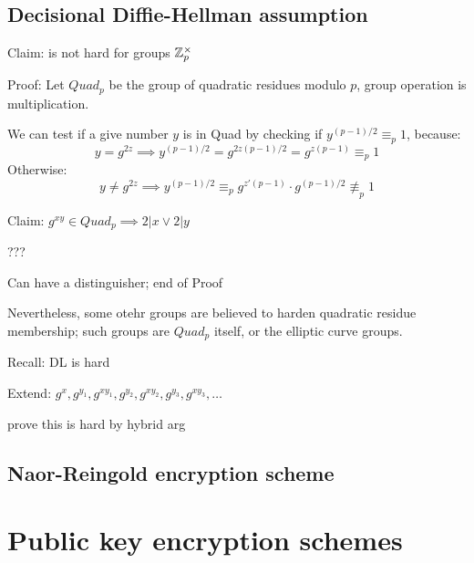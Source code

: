 
\subsection{Decisional Diffie-Hellman assumption}

Claim: \ddh is not hard for groups $\mathbb{Z}_p^\times$

Proof: Let $Quad_p$ be the group of quadratic residues modulo $p$, group operation is multiplication.

We can test if a give number $y$ is in Quad by checking if $y^{(p-1)/2} \equiv_p 1$, because:
\[
    y = g^{2z} \implies y^{(p-1)/2} = g^{2z(p-1)/2} = g^{z(p-1)} \equiv_p 1
\]
Otherwise: %
\[
    y \neq g^{2z} \implies y^{(p-1)/2} \equiv_p g^{z'(p-1)} \cdot g^{(p-1)/2} \not\equiv_p 1
\]

Claim: $g^{xy} \in Quad_p \implies 2 | x \vee 2 | y$

???

Can have a distinguisher; end of Proof

Nevertheless, some otehr groups are believed to harden quadratic residue membership; such groups are $Quad_p$ itself, or the elliptic curve groups.


Recall: DL is hard

Extend: $g^x, g^{y_1}, g^{xy_1}, g^{y_2}, g^{xy_2}, g^{y_3}, g^{xy_3}, \dots$

prove this is hard by hybrid arg

\subsection{Naor-Reingold encryption scheme}



\section{Public key encryption schemes}

